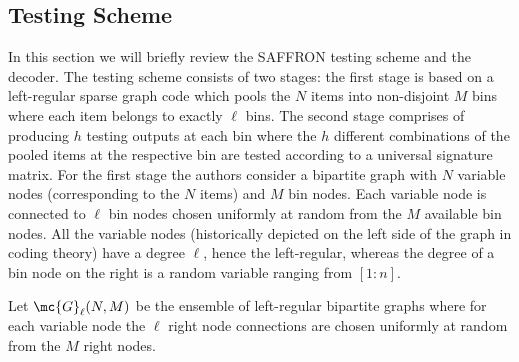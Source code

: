 \documentclass[conference,twocolumn]{IEEEtran}
\DeclareMathOperator*{\bigORtxt}{\scalerel*{\text{$\vee$}}{\textstyle\sum}}
\begin{document}
%
\subsection*{Testing Scheme}
In this section we will briefly review the SAFFRON testing scheme \cite{lee2015saffron} and the decoder. The testing scheme consists of two stages: the first stage is based on a left-regular sparse graph code which pools the $N$ items into non-disjoint $M$ bins where each item belongs to exactly $\ell$ bins. The second stage comprises of producing $h$ testing outputs at each bin where the $h$ different combinations of the pooled items at the respective bin are tested according to a universal signature matrix. For the first stage the authors consider a bipartite graph with $N$ variable nodes (corresponding to the $N$ items) and $M$ bin nodes. Each variable node is connected to $\ell$ bin nodes chosen uniformly at random from the $M$ available bin nodes. All the variable nodes (historically depicted on the left side of the graph in coding theory) have a degree $\ell$, hence the left-regular, whereas the degree of a bin node on the right is a random variable ranging from $[1:n]$.

\begin{definition}
Let $\mc{G}_{\ell}(N,M)$ be the ensemble of left-regular bipartite graphs where for each variable node the $\ell$ right node connections are chosen uniformly at random from the $M$ right nodes.
\end{definition}
\end{document}
